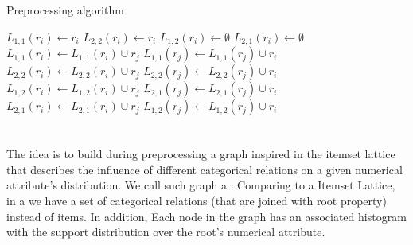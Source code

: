 \begin{algorithm}[!h]
  \caption{Preprocessing algorithm}
  \label{alg3}

     {
      $L_{1,1}(r_i) \leftarrow r_i$ \;
      $L_{2,2}(r_i) \leftarrow r_i$ \;
      $L_{1,2}(r_i) \leftarrow \emptyset$ \;
      $L_{2,1}(r_i) \leftarrow \emptyset$ \;
    }
     {
	 {
	     {
		 {
		    $L_{1,1}(r_i) \leftarrow L_{1,1}(r_i) \cup r_j$ \;
		    $L_{1,1}(r_j) \leftarrow L_{1,1}(r_j) \cup r_i$ \;
		}
		 {
		    $L_{2,2}(r_i) \leftarrow L_{2,2}(r_i) \cup r_j$ \;
		    $L_{2,2}(r_j) \leftarrow L_{2,2}(r_j) \cup r_i$ \;
		}
	    }
	     {
		$L_{1,2}(r_i) \leftarrow L_{1,2}(r_i) \cup r_j$ \;
		$L_{2,1}(r_j) \leftarrow L_{2,1}(r_j) \cup r_i$ \;
	    }
	     {
		$L_{2,1}(r_i) \leftarrow L_{2,1}(r_i) \cup r_j$ \;
		$L_{1,2}(r_j) \leftarrow L_{1,2}(r_j) \cup r_i$ \;
	    }
	}
   }
\end{algorithm}

\subsection{}

\section{\graphname}
\label{ch:lattice}

The idea is to build during preprocessing a graph inspired in the itemset lattice that describes the influence of
different categorical relations on a given numerical attribute's distribution. We call such graph a \graphname.
Comparing to a Itemset Lattice, in a \graphname we have a set of categorical relations (that are joined with root
property) instead of items. In addition, Each node in the graph has an associated histogram with the support
distribution over the root's numerical attribute.

